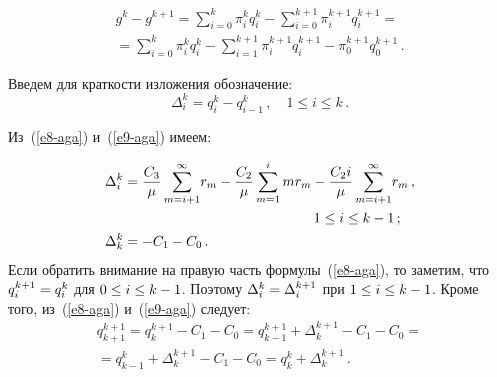 \begin{multicols}{2}
{\vspace*{-2pt}

\noindent
  \begin{multline*}
  g^k-g^{k+1} =\sum\limits^k_{i=0} \pi_i^k q_i^k -\sum\limits_{i=0}^{k+1} 
\pi_i^{k+1} q_i^{k+1}={}\\
  {}=\sum\limits^k_{i=0} \pi_i^k q_i^k -\sum\limits_{i=1}^{k+1} \pi_i^{k+1} 
q_i^{k+1} -\pi_0^{k+1} q_0^{k+1}\,.
  \end{multline*}
  
  Введем для краткости изложения обозначение:
   $$
   \Delta_i^k = q_i^k - q^k_{i-1}\,,\quad 1\leq i\leq k\,.
   $$
   
   Из~(\ref{e8-aga}) и~(\ref{e9-aga}) имеем:

\noindent
  \begin{align*}
  \Delta_i^k &= \fr{C_3}{\mu} \sum\limits^\infty_{m=i+1} \! r_m -
\fr{C_2}{\mu}\sum\limits^i_{m=1} mr_m -\fr{C_2i}{\mu} 
\sum\limits^\infty_{m=i+1} \!r_m\,,\\ 
&\hspace*{48mm} 1\leq i\leq k-1\,;\\
  \Delta_k^k &= -C_1-C_0\,.
  \end{align*}
Если обратить внимание на правую часть формулы~(\ref{e8-aga}), то заметим, 
что $q_i^{k+1} \hm= q_i^k$ для $0\hm\leq i\hm\leq k\hm-1$. Поэтому $\Delta_i^k 
\hm= \Delta_i^{k+1}$ при $1\hm\leq i\hm\leq k\hm-1$. Кроме того,   
из~(\ref{e8-aga}) и~(\ref{e9-aga}) следует:
\begin{multline*}
q_{k+1}^{k+1} = q_k^{k+1} -C_1-C_0= q_{k-1}^{k+1} +\Delta_k^{k+1} -C_1-
C_0={}\\
{}= q_{k-1}^k +\Delta_k^{k+1} -C_1-C_0= q_k^k+\Delta_k^{k+1}\,.
\end{multline*}
  
}
\end{multicols}
